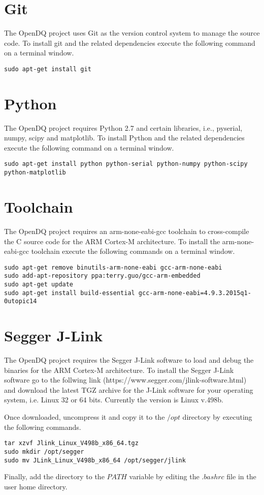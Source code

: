 \section{Git}
The OpenDQ project uses Git as the version control system to manage the source code. To install git and the related dependencies execute the following command on a terminal window.

\begin{verbatim}
sudo apt-get install git
\end{verbatim}

\section{Python}
The OpenDQ project requires Python 2.7 and certain libraries, i.e., pyserial, numpy, scipy and matplotlib. To install Python and the related dependencies execute the following command on a terminal window.

\begin{verbatim}
sudo apt-get install python python-serial python-numpy python-scipy python-matplotlib
\end{verbatim}

\section{Toolchain}
The OpenDQ project requires an arm-none-eabi-gcc toolchain to cross-compile the C source code for the ARM Cortex-M architecture. To install the arm-none-eabi-gcc toolchain execute the following commands on a terminal window.

\begin{verbatim}
sudo apt-get remove binutils-arm-none-eabi gcc-arm-none-eabi
sudo add-apt-repository ppa:terry.guo/gcc-arm-embedded
sudo apt-get update
sudo apt-get install build-essential gcc-arm-none-eabi=4.9.3.2015q1-0utopic14
\end{verbatim}

\section{Segger J-Link}
The OpenDQ project requires the Segger J-Link software to load and debug the binaries for the ARM Cortex-M architecture. To install the Segger J-Link software go to the follwing link (https://www.segger.com/jlink-software.html) and download the latest TGZ archive for the J-Link software for your operating system, i.e. Linux 32 or 64 bits. Currently the version is Linux v.498b.

Once downloaded, uncompress it and copy it to the $/opt$ directory by executing the following commands.
\begin{verbatim}
tar xzvf Jlink_Linux_V498b_x86_64.tgz
sudo mkdir /opt/segger
sudo mv JLink_Linux_V498b_x86_64 /opt/segger/jlink
\end{verbatim}

Finally, add the directory to the $PATH$ variable by editing the $.bashrc$ file in the user home directory.